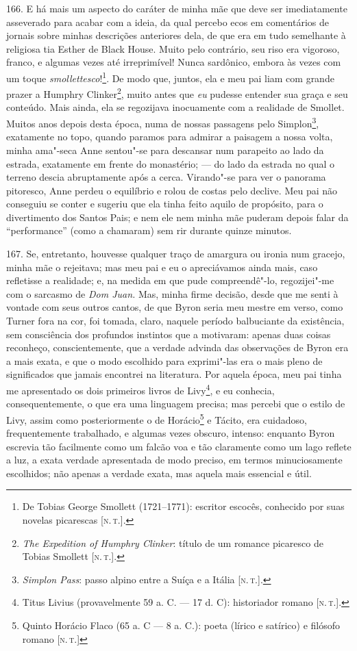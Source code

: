 166. E há mais um aspecto do caráter de minha mãe que deve ser
imediatamente asseverado para acabar com a ideia, da qual percebo ecos
em comentários de jornais sobre minhas descrições anteriores dela, de
que era em tudo semelhante à religiosa tia Esther de Black House. Muito
pelo contrário, seu riso era vigoroso, franco, e algumas vezes até
irreprimível! Nunca sardônico, embora às vezes com um toque
\emph{smollettesco}!\footnote{De Tobias George Smollett (1721--1771):
  escritor escocês, conhecido por suas novelas picarescas {[}\textsc{n.\,t.}{]}.}. De modo que, juntos, ela e meu pai liam com grande prazer a
Humphry Clinker\footnote{\emph{The Expedition of Humphry Clinker}:
  título de um romance picaresco de Tobias Smollett {[}\textsc{n.\,t.}{]}.},
muito antes que \emph{eu} pudesse entender sua graça e seu conteúdo.
Mais ainda, ela se regozijava inocuamente com a realidade de Smollet.
Muitos anos depois desta época, numa de nossas passagens pelo
Simplon\footnote{\emph{Simplon Pass}: passo alpino entre a Suíça e a
  Itália {[}\textsc{n.\,t.}{]}.}, exatamente no topo, quando paramos para
admirar a paisagem a nossa volta, minha ama"-seca Anne sentou"-se para
descansar num parapeito ao lado da estrada, exatamente em frente do
monastério; --- do lado da estrada no qual o terreno descia abruptamente
após a cerca. Virando"-se para ver o panorama pitoresco, Anne perdeu o
equilíbrio e rolou de costas pelo declive. Meu pai não conseguiu se
conter e sugeriu que ela tinha feito aquilo de propósito, para o
divertimento dos Santos Pais; e nem ele nem minha mãe puderam depois
falar da ``performance'' (como a chamaram) sem rir durante quinze
minutos.

167. Se, entretanto, houvesse qualquer traço de amargura ou ironia num
gracejo, minha mãe o rejeitava; mas meu pai e eu o apreciávamos ainda
mais, caso refletisse a realidade; e, na medida em que pude
compreendê"-lo, regozijei"-me com o sarcasmo de \emph{Dom Juan.} Mas,
minha firme decisão, desde que me senti à vontade com seus outros
cantos, de que Byron seria meu mestre em verso, como Turner fora na cor,
foi tomada, claro, naquele período balbuciante da existência, sem
consciência dos profundos instintos que a motivaram: apenas duas coisas
reconheço, conscientemente, que a verdade advinda das observações de
Byron era a mais exata, e que o modo escolhido para exprimi"-las era o
mais pleno de significados que jamais encontrei na literatura. Por
aquela época, meu pai tinha me apresentado os dois primeiros livros de
Livy\footnote{Titus Livius (provavelmente 59 a. C. --- 17 d. C):
  historiador romano {[}\textsc{n.\,t.}{]}.}, e eu conhecia, consequentemente,
o que era uma linguagem precisa; mas percebi que o estilo de Livy, assim
como posteriormente o de Horácio\footnote{Quinto Horácio Flaco (65 a. C
  --- 8 a. C.): poeta (lírico e satírico) e filósofo romano {[}\textsc{n.\,t.}{]}} e Tácito, era cuidadoso, frequentemente trabalhado, e algumas
vezes obscuro, intenso: enquanto Byron escrevia tão facilmente como um
falcão voa e tão claramente como um lago reflete a luz, a exata verdade
apresentada de modo preciso, em termos minuciosamente escolhidos; não
apenas a verdade exata, mas aquela mais essencial e útil.


